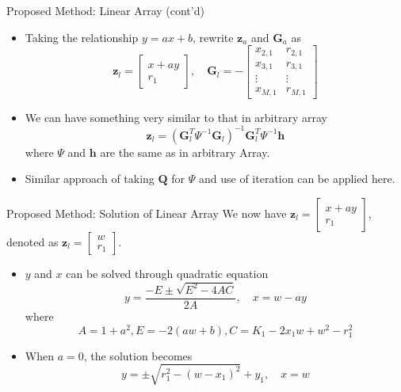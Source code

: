 \documentclass[10pt]{beamer}
\begin{document}
\begin{frame}{Proposed Method: Linear Array (cont'd)}
  \begin{itemize}
    \item Taking the relationship $y=ax+b$, rewrite $\mathbf{z}_a$ and $\mathbf{G}_a$
          as
          $$\mathbf{z}_l=\begin{bmatrix}x+ay\\r_1\end{bmatrix},\quad
            \mathbf{G}_l=-\begin{bmatrix}
                          x_{2,1} & r_{2,1}\\
                          x_{3,1} & r_{3,1}\\
                          \vdots  & \vdots \\
                          x_{M,1} & r_{M,1}\end{bmatrix}$$
    \item We can have something very similar to that in arbitrary array
          $$\mathbf{z}_l=(\mathbf{G}_l^T\Psi^{-1}\mathbf{G}_l)^{-1}\mathbf{G}_l^T\Psi^{-1}\mathbf{h}$$
          where $\Psi$ and $\mathbf{h}$ are the same as in arbitrary Array.
    \item Similar approach of taking $\mathbf{Q}$ for $\Psi$ and use of iteration can be applied here.
  \end{itemize}
\end{frame}

\begin{frame}{Proposed Method: Solution of Linear Array}
  We now have $\mathbf{z}_l=\begin{bmatrix}x+ay\\r_1\end{bmatrix}$,
  denoted as $\mathbf{z}_l=\begin{bmatrix}w\\r_1\end{bmatrix}$.
  \begin{itemize}
    \item $y$ and $x$ can be solved through quadratic equation
          $$y=\frac{-E\pm\sqrt{E^2-4AC}}{2A},\quad x=w-ay$$
          where$$A=1+a^2,E=-2(aw+b),C=K_1-2x_1w+w^2-r_1^2$$
    \item When $a=0$, the solution becomes
          $$y=\pm\sqrt{r_1^2-(w-x_1)^2}+y_1,\quad x=w$$
  \end{itemize}
\end{frame}
\end{document}
